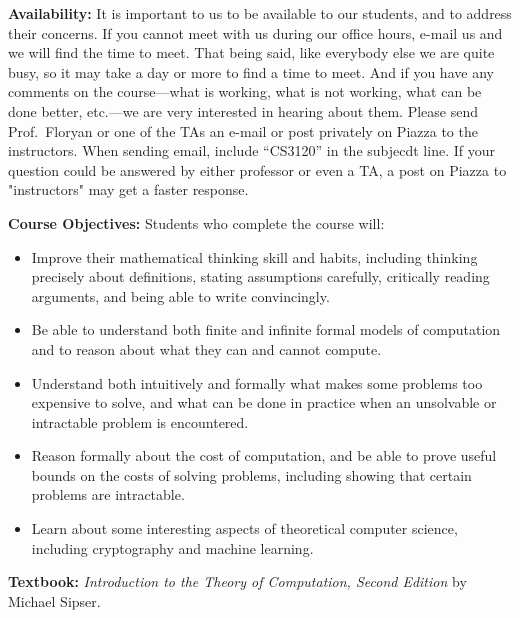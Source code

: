 \documentclass[12pt]{article}
\begin{document}
\textbf{Availability:} It is important to us to be available to our students, and to address their concerns.  If you cannot meet with us during our office hours, e-mail us and we will find the time to meet. That being said, like everybody else we are quite busy, so it may take a day or more to find a time to meet. And if you have any comments on the course---what is working, what is not working, what can be done better, etc.---we are very interested in hearing about them.  Please send Prof.\ Floryan or one of the TAs an e-mail or post privately on Piazza to the instructors.  When sending email, include ``CS3120'' in the subjecdt line. If your question could be answered by either professor or even a TA, a post on Piazza to "instructors" may get a faster response.


\textbf{Course Objectives:} Students who complete the course will:
\begin{itemize}
    \item Improve their mathematical thinking skill and habits, including thinking precisely about definitions, stating assumptions carefully, critically reading arguments, and being able to write convincingly.

    \item Be able to understand both finite and infinite formal models of computation and to reason about what they can and cannot compute.

    \item Understand both intuitively and formally what makes some problems too expensive to solve, and what can be done in practice when an unsolvable or intractable problem is encountered.

    \item Reason formally about the cost of computation, and be able to prove useful bounds on the costs of solving problems, including showing that certain problems are intractable.

    \item Learn about some interesting aspects of theoretical computer science, including cryptography and machine learning.
\end{itemize}

\textbf{Textbook:} \textit{Introduction to the Theory of Computation, Second Edition} by Michael Sipser.\\

\end{document}
